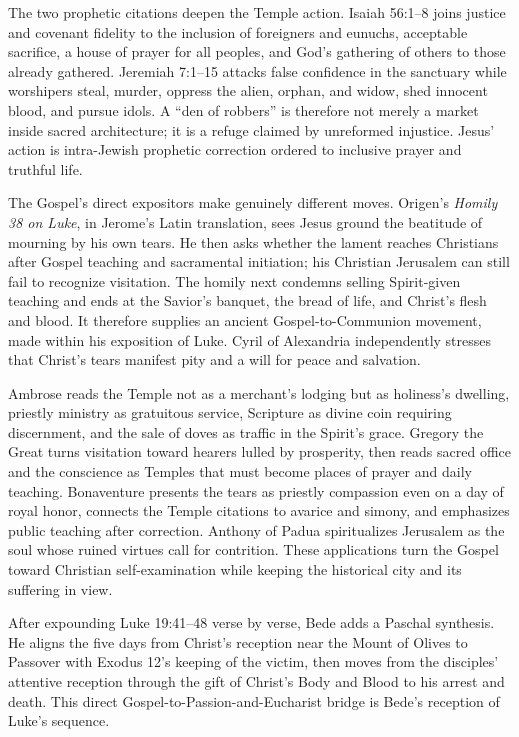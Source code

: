 The two prophetic citations deepen the Temple action. Isaiah 56:1--8 joins justice and covenant fidelity to the inclusion of foreigners and eunuchs, acceptable sacrifice, a house of prayer for all peoples, and God's gathering of others to those already gathered. Jeremiah 7:1--15 attacks false confidence in the sanctuary while worshipers steal, murder, oppress the alien, orphan, and widow, shed innocent blood, and pursue idols. A ``den of robbers'' is therefore not merely a market inside sacred architecture; it is a refuge claimed by unreformed injustice. Jesus' action is intra-Jewish prophetic correction ordered to inclusive prayer and truthful life.

The Gospel's direct expositors make genuinely different moves. Origen's \emph{Homily 38 on Luke}, in Jerome's Latin translation, sees Jesus ground the beatitude of mourning by his own tears. He then asks whether the lament reaches Christians after Gospel teaching and sacramental initiation; his Christian Jerusalem can still fail to recognize visitation. The homily next condemns selling Spirit-given teaching and ends at the Savior's banquet, the bread of life, and Christ's flesh and blood. It therefore supplies an ancient Gospel-to-Communion movement, made within his exposition of Luke. Cyril of Alexandria independently stresses that Christ's tears manifest pity and a will for peace and salvation.

Ambrose reads the Temple not as a merchant's lodging but as holiness's dwelling, priestly ministry as gratuitous service, Scripture as divine coin requiring discernment, and the sale of doves as traffic in the Spirit's grace. Gregory the Great turns visitation toward hearers lulled by prosperity, then reads sacred office and the conscience as Temples that must become places of prayer and daily teaching. Bonaventure presents the tears as priestly compassion even on a day of royal honor, connects the Temple citations to avarice and simony, and emphasizes public teaching after correction. Anthony of Padua spiritualizes Jerusalem as the soul whose ruined virtues call for contrition. These applications turn the Gospel toward Christian self-examination while keeping the historical city and its suffering in view.

After expounding Luke 19:41--48 verse by verse, Bede adds a Paschal synthesis. He aligns the five days from Christ's reception near the Mount of Olives to Passover with Exodus 12's keeping of the victim, then moves from the disciples' attentive reception through the gift of Christ's Body and Blood to his arrest and death. This direct Gospel-to-Passion-and-Eucharist bridge is Bede's reception of Luke's sequence.

